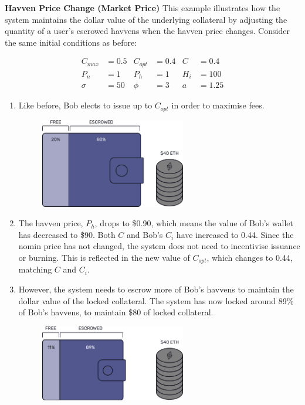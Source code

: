 \newpage

\noindent \textbf{Havven Price Change (Market Price)} This example illustrates how the system maintains the dollar value of the underlying collateral by adjusting the quantity of a user's escrowed havvens when the havven price changes. Consider the same initial conditions as before:

\begin{align*}
C_{max} &= 0.5 & C_{opt} &= 0.4 & C &= 0.4 \\
P_n &= 1 & P_h &= 1 & H_i &= 100 \\
\sigma &= 50 & \phi &= 3 & a&= 1.25
\end{align*}

\begin{enumerate}
\item{Like before, Bob elects to issue up to $C_{opt}$ in order to maximise fees.}
\begin{figure}[h!]
    \centering
    \includegraphics[width=0.6\textwidth]{img/escrowed}
\end{figure}
\item{The havven price, $P_h$, drops to \$0.90, which means the value of Bob's wallet has decreased to \$90. Both $C$ and Bob's $C_i$ have increased to 0.44. Since the nomin price has not changed, the system does not need to incentivise issuance or burning. This is reflected in the new value of $C_{opt}$, which changes to 0.44, matching $C$ and $C_i$. }
\item{However, the system needs to escrow more of Bob's havvens to maintain the dollar value of the locked collateral. The system has now locked around 89\% of Bob's havvens, to maintain \$80 of locked collateral.}
\begin{figure}[h!]
    \centering
    \includegraphics[width=0.6\textwidth]{img/ph_drop}
\end{figure}
\end{enumerate} 

